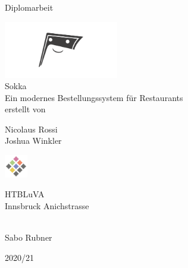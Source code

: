 \begin{titlepage}
	\begin{center}
		\Large{Diplomarbeit} \\
		
		\bigskip
		\bigskip
		\bigskip

		\includegraphics[width=5cm]{../images/sokka.png} \\
		\Huge{Sokka} \\
		\bigskip
		\bigskip
		\bigskip
		\huge{Ein modernes Bestellungssystem für Restaurants} \\

		\bigskip
		\bigskip
		\bigskip
		\large{erstellt von} \\

		\bigskip
		\bigskip
		\bigskip
		
		\Huge{Nicolaus Rossi} \\
		\Huge{Joshua Winkler} \\
		\bigskip
		\bigskip
		\bigskip

		
		\bigskip
	    \bigskip
        
        \includegraphics[width=1cm]{../images/htl-logo}

		\Large{HTBLuVA} \\
		\Large{Innsbruck Anichstrasse} \\

		\bigskip		
		\bigskip
		\bigskip

		 \\
		Sabo Rubner

		\bigskip
		\bigskip
		\bigskip
		\bigskip
		
		\Large{2020/21}

	\end{center}
 
\end{titlepage}